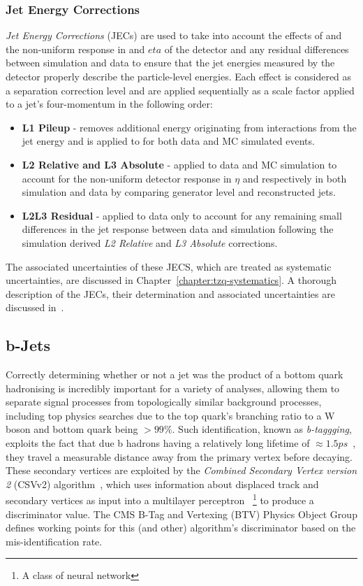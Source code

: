 {\subsubsection{Jet Energy Corrections}
\emph{Jet Energy Corrections} (JECs) are used to take into account the effects of \PU and the non-uniform response in \pT and $eta$ of the detector and any residual differences between simulation and data to ensure that the jet energies measured by the detector properly describe the particle-level energies.
Each effect is considered as a separation correction level and are applied sequentially as a scale factor applied to a jet's four-momentum in the following order:

\begin{itemize}
\item \textbf{L1 Pileup} - removes additional energy originating from \PU interactions from the jet energy and is applied to for both data and MC simulated events. 
\item \textbf{L2 Relative and L3 Absolute} - applied to data and MC simulation to account for the non-uniform detector response in $\eta$ and \pT respectively in both simulation and data by comparing generator level and reconstructed jets.
\item \textbf{L2L3 Residual} - applied to data only to account for any remaining small differences in the jet response between data and simulation following the simulation derived \emph{L2 Relative} and \emph{L3 Absolute} corrections.
\end{itemize}

The associated uncertainties of these JECS, which are treated as systematic uncertainties, are discussed in Chapter~\ref{chapter:tzq-systematics}.
A thorough description of the JECs, their determination and associated uncertainties are discussed in~\cite{Khachatryan:2016kdb}.

\subsection{b-Jets}
Correctly determining whether or not a jet was the product of a bottom quark hadronising is incredibly important for a variety of analyses, allowing them to separate signal processes from topologically similar background processes, including top physics searches due to the top quark's branching ratio to a W boson and bottom quark being $> 99\%$.
Such identification, known as \emph{b-taggging}, exploits the fact that due b hadrons having a relatively long lifetime of $\approx 1.5 ps$~\cite{Beringer:1900zz}, they travel a measurable distance away from the primary vertex before decaying. 
These secondary vertices are exploited by the \emph{Combined Secondary Vertex version 2} (CSVv2) algorithm~\cite{Chatrchyan:2012jua,CMS:206kkf}, which uses information about displaced track and secondary vertices as input into a multilayer perceptron ~\footnote{A class of neural network} to produce a discriminator value.
The CMS B-Tag and Vertexing (BTV) Physics Object Group defines working points for this (and other) algorithm's discriminator based on the mis-identification rate.

}
